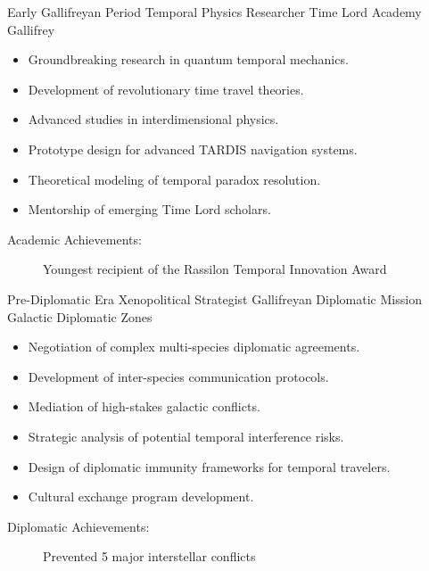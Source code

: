 \begin{cvsubentries}
  \cvsubentry
  {Early Gallifreyan Period}%
  {Temporal Physics Researcher}%
  {Time Lord Academy}%
  {Gallifrey}%
  {%
    \begin{itemize}
      \item Groundbreaking research in quantum temporal mechanics.
      \item Development of revolutionary time travel theories.
      \item Advanced studies in interdimensional physics.
      \item Prototype design for advanced TARDIS navigation systems.
      \item Theoretical modeling of temporal paradox resolution.
      \item Mentorship of emerging Time Lord scholars.
    \end{itemize}
  }{%
    \begin{description}%
      \item[Academic Achievements:] Youngest recipient of the Rassilon Temporal Innovation Award
    \end{description}%
  }

  \cvsubentry
  {Pre-Diplomatic Era}%
  {Xenopolitical Strategist}%
  {Gallifreyan Diplomatic Mission}%
  {Galactic Diplomatic Zones}%
  {%
    \begin{itemize}
      \item Negotiation of complex multi-species diplomatic agreements.
      \item Development of inter-species communication protocols.
      \item Mediation of high-stakes galactic conflicts.
      \item Strategic analysis of potential temporal interference risks.
      \item Design of diplomatic immunity frameworks for temporal travelers.
      \item Cultural exchange program development.
    \end{itemize}
  }{%
    \begin{description}%
      \item[Diplomatic Achievements:] Prevented 5 major interstellar conflicts
    \end{description}%
  }
\end{cvsubentries}
